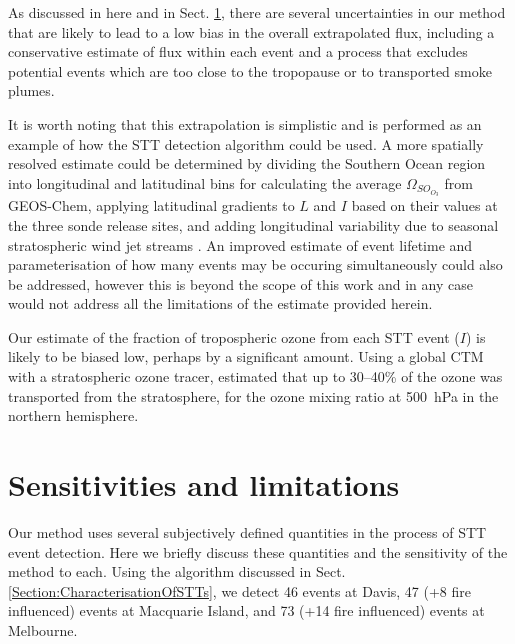 \documentclass[acp, manuscript]{copernicus} %
\begin{document}
    As discussed in here and in Sect. \ref{sec:sensitivity}, there are several uncertainties in our method that are likely to lead to a low bias in the overall extrapolated flux, including a conservative estimate of flux within each event and a process that excludes potential events which are too close to the tropopause or to transported smoke plumes.
    
    It is worth noting that this extrapolation is simplistic and is performed as an example of how the STT detection algorithm could be used.
    A more spatially resolved estimate could be determined by dividing the Southern Ocean region into longitudinal and latitudinal bins for calculating the average $\Omega_{SO_{O_3}}$ from GEOS-Chem, applying latitudinal gradients to $L$ and $I$ based on their values at the three sonde release sites, and adding longitudinal variability due to seasonal stratospheric wind jet streams \citep{Baray2012,Skerlak2015}.
    An improved estimate of event lifetime and parameterisation of how many events may be occuring simultaneously could also be addressed, however this is beyond the scope of this work and in any case would not address all the limitations of the estimate provided herein.

    
    Our estimate of the fraction of tropospheric ozone from each STT event ($I$) is likely to be biased low, perhaps by a significant amount.
    Using a global CTM with a stratospheric ozone tracer, \citet{Terao2008} estimated that up to 30--40\% of the ozone was transported from the stratosphere, for the ozone mixing ratio at 500~hPa in the northern hemisphere.

\section{Sensitivities and limitations}
\label{sec:sensitivity}
  Our method uses several subjectively defined quantities in the process of STT event detection.
  Here we briefly discuss these quantities and the sensitivity of the method to each.
  Using the algorithm discussed in Sect. \ref{Section:CharacterisationOfSTTs}, we detect 46 events at Davis, 47 (+8 fire influenced) events at Macquarie Island, and 73 (+14 fire influenced) events at Melbourne.
  
\end{document}
